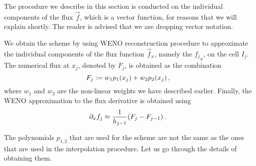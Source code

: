 \documentclass{amsart}
\theoremstyle{definition}
\theoremstyle{remark}
\numberwithin{equation}{section}
\begin{document}
	\begin{Rem} The procedure we describe in this section is conducted on the  individual components of the flux $\vec{f}$, which is a vector function, for reasons that we will explain shortly.  The reader is advised that we are dropping vector notation.
	\end{Rem}
	
We obtain the scheme by using  WENO reconstruction procedure to approximate the individual components of the flux function $\vec{f}_x$, namely the $ {f_j}_x$, on the cell $I_j$.  The numerical flux at $x_{j}$, denoted by
	$F_{j}$, is obtained as the combination
	\begin{equation}\label{eq_f_WENO}
		F_{j}:=w_1p_1\!\left({x_{j}}\right) +w_2p_2\!\left({x_{j}}\right),
	\end{equation}
	where $w_1$ and $w_2$ are the non-linear weights we have described earlier.
	Finally, the WENO approximation to the flux derivative is obtained using
	\begin{equation}\label{eq_WENO_approx_flux_derivative}
		\partial_x f_j\approx \frac{1}{h_{j-1}}\!\left({F_{j}- F_{j-1}}\right).
	\end{equation}
\begin{Rem} The polynomials $p_{1,2}$	that are used for the scheme are not the same as the ones that are used in the interpolation procedure.  Let us go through the details of obtaining them.
\end{Rem}
	
	
	
	
\end{document}
